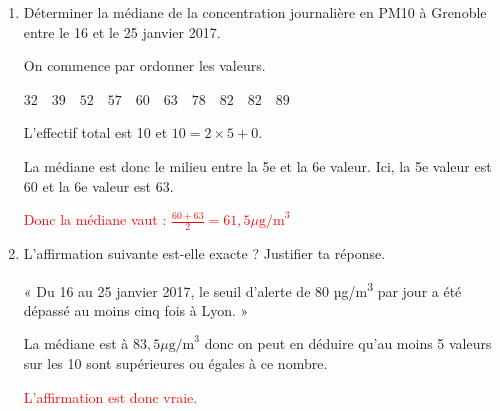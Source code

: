 \documentclass[a4paper]{book}
\begin{document}
{\begin{exercice}
\begin{enumerate}
            \textcolor{red}{La concentration moyenne en PM10 est plus forte sur Lyon que sur Grenoble sur ces 10 jours.}
            
            \item Déterminer la médiane de la concentration journalière en PM10 à Grenoble entre le 16 et le 25 janvier 2017.

            On commence par ordonner les valeurs.

            $32 \quad 39 \quad 52 \quad 57 \quad 60 \quad 63 \quad 78 \quad 82 \quad 82 \quad 89$

            L'effectif total est 10 et $10=2\times5+0$.

            La médiane est donc le milieu entre la 5e et la 6e valeur. Ici, la 5e valeur est $60$ et la 6e valeur est $63$.

            \textcolor{red}{Donc la médiane vaut : 
            $\frac{60+63}{2}=61,5\mu \text{g/m}^3$}
        
            \item L'affirmation suivante est-elle exacte ? Justifier ta réponse.
        
            « Du 16 au 25 janvier 2017, le seuil d'alerte de 80 µg/m\textsuperscript{3} par jour a été dépassé au moins cinq fois à Lyon. »

            La médiane est à $83,5 \mu \text{g/m}^3$ donc on peut en déduire qu'au moins 5 valeurs sur les 10 sont supérieures ou égales à ce nombre.

            \textcolor{red}{L'affirmation est donc vraie.}
        \end{enumerate}
    \end{exercice}
}
\end{document}
